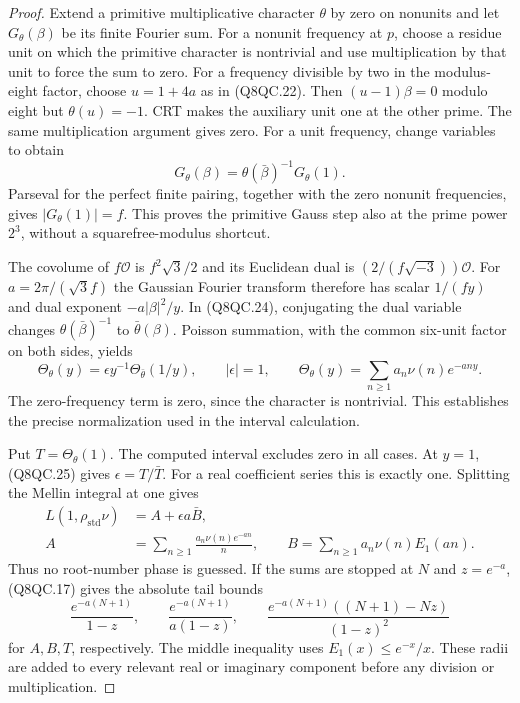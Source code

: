 \begin{proof}
Extend a primitive multiplicative character $\theta$ by zero
on nonunits and let $G_\theta(\beta)$ be its finite Fourier sum.
For a nonunit frequency at $p$, choose a residue unit on which
the primitive character is nontrivial and use multiplication
by that unit to force the sum to zero.
For a frequency divisible by two in the modulus-eight factor,
choose $u=1+4a$ as in (Q8QC.22).
Then $(u-1)\beta=0$ modulo eight but $\theta(u)=-1$.
CRT makes the auxiliary unit one at the other prime.
The same multiplication argument gives zero.
For a unit frequency, change variables to obtain
\[
       G_\theta(\beta)=\theta(\bar\beta)^{-1}G_\theta(1).
 \tag{Q8QC.24}
\]
Parseval for the perfect finite pairing, together with the zero
nonunit frequencies, gives $|G_\theta(1)|=f$.
This proves the primitive Gauss step also at the prime power
$2^3$, without a squarefree-modulus shortcut.

The covolume of $f\mathcal O$ is $f^2\sqrt3/2$ and its
Euclidean dual is $(2/(f\sqrt{-3}))\mathcal O$.
For $a=2\pi/(\sqrt3 f)$ the Gaussian Fourier transform therefore
has scalar $1/(fy)$ and dual exponent $-a|\beta|^2/y$.
In (Q8QC.24), conjugating the dual variable changes
$\theta(\bar\beta)^{-1}$ to $\bar\theta(\beta)$.
Poisson summation, with the common six-unit factor on both
sides, yields
\[
 \Theta_\theta(y)=\epsilon y^{-1}
                         \Theta_{\bar\theta}(1/y),
 \qquad |\epsilon|=1,\qquad
 \Theta_\theta(y)=\sum_{n\geq1}a_n\nu(n)e^{-any}.
 \tag{Q8QC.25}
\]
The zero-frequency term is zero, since the character is nontrivial.
This establishes the precise normalization used in the interval
calculation.

Put $T=\Theta_\theta(1)$.
The computed interval excludes zero in all cases.
At $y=1$, (Q8QC.25) gives
$\epsilon=T/\bar T$.
For a real coefficient series this is exactly one.
Splitting the Mellin integral at one gives
\[
 \begin{aligned}
 L(1,\rho_{\mathrm{std}}\nu)
     &=A+\epsilon a\bar B,\\
 A&=\sum_{n\geq1}\frac{a_n\nu(n)e^{-an}}n,\qquad
 B=\sum_{n\geq1}a_n\nu(n)E_1(an).
 \end{aligned}
 \tag{Q8QC.26}
\]
Thus no root-number phase is guessed.
If the sums are stopped at $N$ and $z=e^{-a}$, (Q8QC.17) gives
the absolute tail bounds
\[
 \frac{e^{-a(N+1)}}{1-z},\qquad
 \frac{e^{-a(N+1)}}{a(1-z)},\qquad
 \frac{e^{-a(N+1)}((N+1)-Nz)}{(1-z)^2}
 \tag{Q8QC.27}
\]
for $A,B,T$, respectively.
The middle inequality uses $E_1(x)\leq e^{-x}/x$.
These radii are added to every relevant real or imaginary
component before any division or multiplication.


\end{proof}
